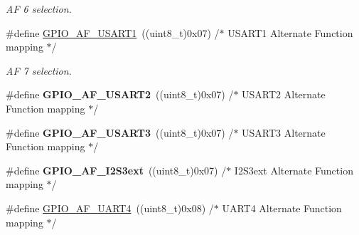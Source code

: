 \begin{DoxyCompactItemize}
\begin{DoxyCompactList}\small\item\em AF 6 selection. \end{DoxyCompactList}\item 
\#define \hyperlink{group___g_p_i_o___alternat__function__selection__define_ga790e1f37e75f475cf09c211f566fb069}{G\+P\+I\+O\+\_\+\+A\+F\+\_\+\+U\+S\+A\+R\+T1}~((uint8\+\_\+t)0x07)  /$\ast$ U\+S\+A\+R\+T1 Alternate Function mapping $\ast$/\hypertarget{group___g_p_i_o___alternat__function__selection__define_ga790e1f37e75f475cf09c211f566fb069}{}\label{group___g_p_i_o___alternat__function__selection__define_ga790e1f37e75f475cf09c211f566fb069}

\begin{DoxyCompactList}\small\item\em AF 7 selection. \end{DoxyCompactList}\item 
\#define {\bfseries G\+P\+I\+O\+\_\+\+A\+F\+\_\+\+U\+S\+A\+R\+T2}~((uint8\+\_\+t)0x07)  /$\ast$ U\+S\+A\+R\+T2 Alternate Function mapping $\ast$/\hypertarget{group___g_p_i_o___alternat__function__selection__define_ga5e74db1f4d0fc3527aa067093625171b}{}\label{group___g_p_i_o___alternat__function__selection__define_ga5e74db1f4d0fc3527aa067093625171b}

\item 
\#define {\bfseries G\+P\+I\+O\+\_\+\+A\+F\+\_\+\+U\+S\+A\+R\+T3}~((uint8\+\_\+t)0x07)  /$\ast$ U\+S\+A\+R\+T3 Alternate Function mapping $\ast$/\hypertarget{group___g_p_i_o___alternat__function__selection__define_ga97742da355d32c599527813eaf109ec7}{}\label{group___g_p_i_o___alternat__function__selection__define_ga97742da355d32c599527813eaf109ec7}

\item 
\#define {\bfseries G\+P\+I\+O\+\_\+\+A\+F\+\_\+\+I2\+S3ext}~((uint8\+\_\+t)0x07)  /$\ast$ I2\+S3ext Alternate Function mapping $\ast$/\hypertarget{group___g_p_i_o___alternat__function__selection__define_ga8fac28d42bc99794bb74707c141fc0f6}{}\label{group___g_p_i_o___alternat__function__selection__define_ga8fac28d42bc99794bb74707c141fc0f6}

\item 
\#define \hyperlink{group___g_p_i_o___alternat__function__selection__define_gad1754187e64b66681cc1447695062706}{G\+P\+I\+O\+\_\+\+A\+F\+\_\+\+U\+A\+R\+T4}~((uint8\+\_\+t)0x08)  /$\ast$ U\+A\+R\+T4 Alternate Function mapping $\ast$/\hypertarget{group___g_p_i_o___alternat__function__selection__define_gad1754187e64b66681cc1447695062706}{}\label{group___g_p_i_o___alternat__function__selection__define_gad1754187e64b66681cc1447695062706}


\end{DoxyCompactItemize}
